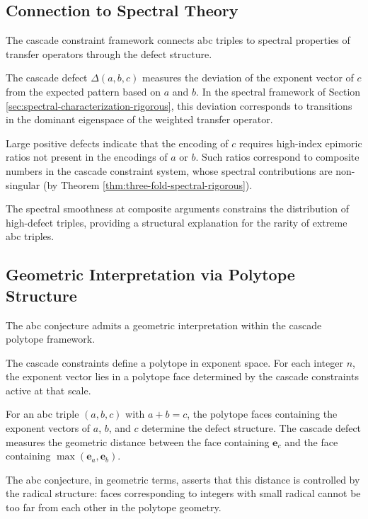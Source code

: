 \subsection{Connection to Spectral Theory}
\label{subsec:abc-spectral-connection}

The cascade constraint framework connects abc triples to spectral properties of transfer operators through the defect structure.

\begin{observation}
The cascade defect $\Delta(a,b,c)$ measures the deviation of the exponent vector of $c$ from the expected pattern based on $a$ and $b$. In the spectral framework of Section \ref{sec:spectral-characterization-rigorous}, this deviation corresponds to transitions in the dominant eigenspace of the weighted transfer operator.

Large positive defects indicate that the encoding of $c$ requires high-index epimoric ratios not present in the encodings of $a$ or $b$. Such ratios correspond to composite numbers in the cascade constraint system, whose spectral contributions are non-singular (by Theorem \ref{thm:three-fold-spectral-rigorous}).

The spectral smoothness at composite arguments constrains the distribution of high-defect triples, providing a structural explanation for the rarity of extreme abc triples.
\end{observation}

\subsection{Geometric Interpretation via Polytope Structure}
\label{subsec:abc-polytope-interpretation}

The abc conjecture admits a geometric interpretation within the cascade polytope framework.

\begin{observation}
The cascade constraints define a polytope in exponent space. For each integer $n$, the exponent vector lies in a polytope face determined by the cascade constraints active at that scale.

For an abc triple $(a,b,c)$ with $a + b = c$, the polytope faces containing the exponent vectors of $a$, $b$, and $c$ determine the defect structure. The cascade defect measures the geometric distance between the face containing $\mathbf{e}_c$ and the face containing $\max(\mathbf{e}_a, \mathbf{e}_b)$.

The abc conjecture, in geometric terms, asserts that this distance is controlled by the radical structure: faces corresponding to integers with small radical cannot be too far from each other in the polytope geometry.
\end{observation}

